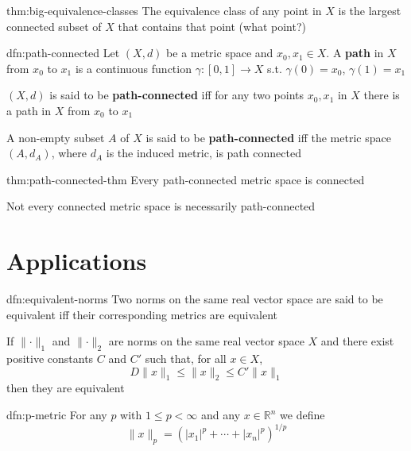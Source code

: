 \documentclass[landscape, 8pt]{extarticle}
\begin{document}
\begin{multicols}{3}
\begin{thm}{thm:big-equivalence-classes}{}
    The equivalence class of any point in $X$ is the largest connected subset of $X$ that contains that point (what point?)
\end{thm}

\begin{dfn}{dfn:path-connected}{}
    Let $(X, d)$ be a metric space and $x_{0}, x_{1}\in X$. A \textbf{path} in $X$ from $x_{0}$ to $x_{1}$ is a continuous function $\gamma : [0, 1] \to X$ s.t. $\gamma(0) = x_{0}$, $\gamma(1) = x_{1}$

    $(X, d)$ is said to be \textbf{path-connected} iff for any two points $x_{0}, x_{1}$ in $X$ there is a path in $X$ from $x_{0}$ to $x_{1}$

    A non-empty subset $A$ of $X$ is said to be \textbf{path-connected} iff the metric space $(A, d_{A})$, where $d_{A}$ is the induced metric, is path connected
\end{dfn}

\begin{thm}{thm:path-connected-thm}{}
    Every path-connected metric space is connected

    Not every connected metric space is necessarily path-connected
\end{thm}


\section{Applications}


\begin{dfn}{dfn:equivalent-norms}{}
    Two norms on the same real vector space are said to be equivalent iff their corresponding metrics are equivalent

    \longrule{0.08ex}
    If $\lVert \cdot \rVert_{1}$ and $\lVert \cdot \rVert_{2}$ are norms on the same real vector space $X$ and there exist positive constants $C$ and $C'$ such that, for all $x\in X$,
    \[D \lVert x \rVert_{1} \le \lVert x \rVert_{2} \le C' \lVert x \rVert_{1}\]
    then they are equivalent
\end{dfn}

\begin{thm}{dfn:p-metric}{}
    For any $p$ with $1 \le p < \infty$ and any $x\in \mathbb{R}^{n}$ we define
    \[\lVert x \rVert_{p} = (\lvert x_{1} \rvert^{p} + \cdots + \lvert x_{n} \rvert^{p})^{1 /p}\]


\end{thm}
\end{multicols}
\end{document}
